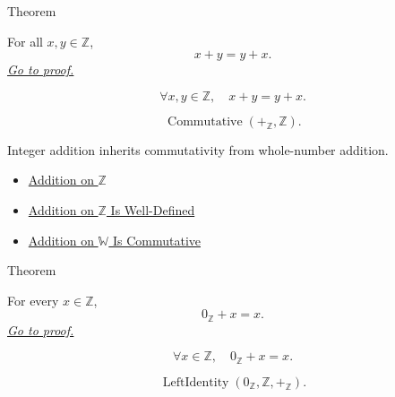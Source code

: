 \begin{theorembox}{Theorem}
\begin{theorem}
\label{thm:addition-on-z-commutative}
For all $x,y\in\mathbb{Z}$,
\[
x+y=y+x.
\]
\hyperref[prf:addition-on-z-commutative]{\textit{Go to proof.}}
\end{theorem}
\end{theorembox}

\begin{remark*}
\[
\forall x,y\in\mathbb{Z},\quad x+y=y+x.
\]
\end{remark*}

\begin{remark*}
\[
\operatorname{Commutative}(+_{\mathbb{Z}},\mathbb{Z}).
\]
\end{remark*}

\begin{remark*}[Interpretation]
Integer addition inherits commutativity from whole-number addition.
\end{remark*}

\begin{dependencies}
\begin{itemize}
  \item \hyperref[def:addition-on-z-classes]{Addition on $\mathbb{Z}$}
  \item \hyperref[thm:addition-on-z-well-defined]{Addition on $\mathbb{Z}$ Is Well-Defined}
  \item \hyperref[thm:addition-on-w-commutative]{Addition on $\mathbb{W}$ Is Commutative}
\end{itemize}
\end{dependencies}

\begin{theorembox}{Theorem}
\begin{theorem}
\label{thm:zero-left-additive-identity-on-z}
For every $x\in\mathbb{Z}$,
\[
0_{\mathbb{Z}}+x=x.
\]
\hyperref[prf:zero-left-additive-identity-on-z]{\textit{Go to proof.}}
\end{theorem}
\end{theorembox}

\begin{remark*}
\[
\forall x\in\mathbb{Z},\quad 0_{\mathbb{Z}}+x=x.
\]
\end{remark*}

\begin{remark*}
\[
\operatorname{LeftIdentity}(0_{\mathbb{Z}},\mathbb{Z},+_{\mathbb{Z}}).
\]
\end{remark*}

